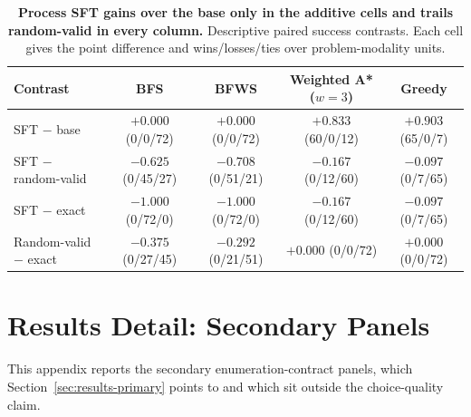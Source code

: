 \begin{table}[t]
\caption{\textbf{Process SFT gains over the base only in the additive cells and trails random-valid in every column.} Descriptive paired success contrasts. Each cell gives the point difference and wins/losses/ties over problem-modality units.}
\label{tab:results-contrasts}
\centering\footnotesize
\setlength{\tabcolsep}{2pt}
\begin{tabular}{lcccc}
\toprule[0.4mm]
\rowcolor{mygray}\textbf{Contrast} & \textbf{BFS} & \textbf{BFWS} & \textbf{Weighted A* ($w{=}3$)} & \textbf{Greedy} \\
\midrule
SFT $-$ base & $+0.000$ (0/0/72) & $+0.000$ (0/0/72) & $+0.833$ (60/0/12) & $+0.903$ (65/0/7) \\
SFT $-$ random-valid & $-0.625$ (0/45/27) & $-0.708$ (0/51/21) & $-0.167$ (0/12/60) & $-0.097$ (0/7/65) \\
SFT $-$ exact & $-1.000$ (0/72/0) & $-1.000$ (0/72/0) & $-0.167$ (0/12/60) & $-0.097$ (0/7/65) \\
Random-valid $-$ exact & $-0.375$ (0/27/45) & $-0.292$ (0/21/51) & $+0.000$ (0/0/72) & $+0.000$ (0/0/72) \\
\bottomrule
\end{tabular}
\end{table}

\section{Results Detail: Secondary Panels}
\label{app:results-secondary}
\label{sec:results-secondary}

This appendix reports the secondary enumeration-contract panels, which Section~\ref{sec:results-primary} points to and which sit outside the choice-quality claim.

